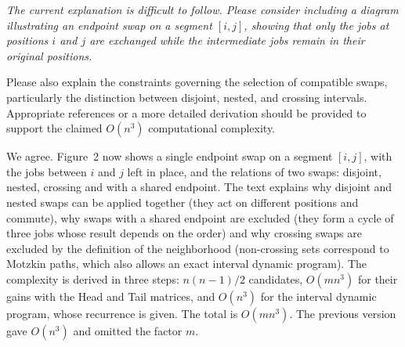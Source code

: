 \documentclass[12pt]{article}
\newenvironment{rc}[1]{\par\medskip\noindent\itshape\renewcommand{\emph}[1]{\textbf{##1}}\ignorespaces}{\par}
\newcommand{\answer}[1]{\par\smallskip\noindent #1\par}
\begin{document}
\begin{rc}{R2 2.3 --- Motzkin neighborhood: diagram, compatibility, $O(n^3)$}
The current explanation is difficult to follow. Please consider including a diagram illustrating an endpoint swap on a segment $[i,j]$, showing that only the jobs at positions $i$ and $j$ are exchanged while the intermediate jobs remain in their original positions.

Please also explain the constraints governing the selection of compatible swaps, particularly the distinction between disjoint, nested, and crossing intervals. Appropriate references or a more detailed derivation should be provided to support the claimed $O(n^3)$ computational complexity.
\end{rc}
\answer{We agree. Figure~2 now shows a single endpoint swap on a segment $[i,j]$, with the jobs between $i$ and $j$ left in place, and the relations of two swaps: disjoint, nested, crossing and with a shared endpoint. The text explains why disjoint and nested swaps can be applied together (they act on different positions and commute), why swaps with a shared endpoint are excluded (they form a cycle of three jobs whose result depends on the order) and why crossing swaps are excluded by the definition of the neighborhood (non-crossing sets correspond to Motzkin paths, which also allows an exact interval dynamic program). The complexity is derived in three steps: $n(n-1)/2$ candidates, $O(mn^3)$ for their gains with the Head and Tail matrices, and $O(n^3)$ for the interval dynamic program, whose recurrence is given. The total is $O(mn^3)$. The previous version gave $O(n^3)$ and omitted the factor $m$.}
\end{document}
